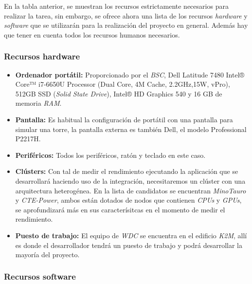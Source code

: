En la tabla anterior, se muestran los recursos estrictamente necesarios para realizar la tarea, sin embargo, se ofrece ahora una lista de los recursos \textit{hardware} y \textit{software} que se utilizarán para la realización del proyecto en general. Además hay que tener en cuenta todos los recursos humanos necesarios.

\subsubsection{Recursos hardware}

\begin{itemize}

 \item \textbf{Ordenador portátil:} Proporcionado por el \textit{BSC}, Dell Latitude 7480 Intel® Core™ i7-6650U Processor (Dual Core, 4M Cache, 2.2GHz,15W, vPro), 512GB SSD (\textit{Solid State Drive}), Intel® HD Graphics 540 y 16 GB de memoria \textit{RAM}.
 
 \item \textbf{Pantalla:} Es habitual la configuración de portátil con una pantalla para simular una torre, la pantalla externa es también Dell, el modelo Professional P2217H.
 
 \item \textbf{Periféricos:} Todos los periféricos, ratón y teclado en este caso.
 
 \item \textbf{Clústers:} Con tal de medir el rendimiento ejecutando la aplicación que se desarrollará haciendo uso de la integración, necesitaremos un clúster con una arquitectura heterogénea. En la lista de candidatos se encuentran \textit{MinoTauro} y \textit{CTE-Power}, ambos están dotados de nodos que contienen \textit{CPUs} y \textit{GPUs}, se aprofundizará más en sus caracterísitcas en el momento de medir el rendimiento.
 
 \item \textbf{Puesto de trabajo:} El equipo de \textit{WDC} se encuentra en el edificio \textit{K2M}, allí es donde el desarrollador tendrá un puesto de trabajo y podrá desarrollar la mayoría del proyecto.
 
\end{itemize}

\subsubsection{Recursos software}

